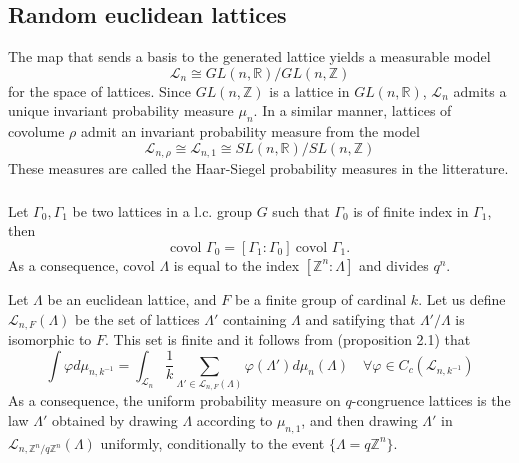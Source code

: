 \documentclass{article}
\begin{document}
\subsection{Random euclidean lattices}
The map that sends a basis to the generated lattice yields a measurable model 
\[\mathcal L_n \cong  GL(n,\mathbb R) / GL(n,\mathbb Z) \]
for the space of lattices. Since $GL(n,\mathbb Z)$ is a lattice in $GL(n,\mathbb R)$, $\mathcal L_n$ admits a unique invariant probability measure $\mu_n$. In a similar manner, lattices of covolume $\rho$ admit an invariant probability measure from the model 
\[\mathcal L_{n,\rho} \cong \mathcal L_{n,1}\cong SL(n,\mathbb R) / SL(n,\mathbb Z)\]
These measures are called the Haar-Siegel probability measures in the litterature.


\subsubsection{}
Let $\Gamma_0 , \Gamma_1$ be two lattices in a l.c. group $G$ such that $\Gamma_0$ is of finite index in $\Gamma_1$, then 
\[ \text{covol } \Gamma_0  = [\Gamma_1 : \Gamma_0 ] \ \text{covol } \Gamma_1 .\]
As a consequence, $\text{covol }\Lambda $ is equal to the index $[\mathbb Z^n : \Lambda]$ and divides $q^n$.

Let $\Lambda$ be an euclidean lattice, and $F$ be a finite group of cardinal $k$. Let us define $\mathcal L_{n , F}(\Lambda ) $ be the set of lattices $\Lambda'$ containing $\Lambda$ and satifying that $\Lambda' / \Lambda $ is isomorphic to $F$. This set is finite and it follows from \cite{ordentlich2022new} (proposition 2.1) that
\[\int \varphi d\mu_{n,k^{-1}} = \int_{\mathcal L_n} \frac{1}{k}\sum_{\Lambda'\in \mathcal L_{n , F}(\Lambda )} \varphi(\Lambda') d\mu_{n}(\Lambda)  \quad \forall \varphi \in C_c(\mathcal L_{n,k^{-1}} ) \]
As a consequence, the uniform probability measure on $q$-congruence lattices is the law $\Lambda'$ obtained by drawing $\Lambda$ according to $\mu_{n,1}$, and then drawing $\Lambda'$ in $\mathcal L_{n,\mathbb Z^n /q\mathbb Z^n}(\Lambda)$ uniformly, conditionally to the event $\{\Lambda = q\mathbb Z^n\}$.
\end{document}
